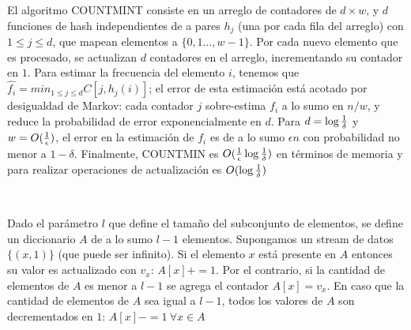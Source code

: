 \documentclass[a4paper,10pt, oneside]{article}
\begin{document}
El algoritmo COUNTMINT\cite{Cormode:2005:IDS:1073713.1073718} consiste en un arreglo de contadores de $d \times w$, y $d$ funciones de hash independientes de a pares $h_j$ (una por cada fila del arreglo) con $1 \leq j \leq d$, que mapean elementos a $\{0, 1 \dots, w-1 \}$. Por cada nuevo elemento que es procesado, se actualizan $d$ contadores en el arreglo, incrementando su contador en $1$. Para estimar la frecuencia del elemento $i$, tenemos que $\hat{f_i} = min_{1 \leq j \leq d} C[j,h_j(i)]$; el error de esta estimación está acotado por desigualdad de Markov: cada contador $j$ sobre-estima $f_i$ a lo sumo en $n/w$, y reduce la probabilidad de error exponencialmente en $d$. Para $d=\log {1 \over \delta}$ y $w = O({1 \over \epsilon})$, el error en la estimación de $f_i$ es de a lo sumo $\epsilon n$ con probabilidad no menor a $1-\delta$. Finalmente, COUNTMIN es $O({1 \over \epsilon} \log {1 \over \delta})$ en términos de memoria y para realizar operaciones de actualización es $O(\log {1 \over \delta})$

\



 Dado el parámetro $l$ que define el tamaño del subconjunto de elementos, se define un diccionario $A$ de a lo sumo $l-1$ elementos. Supongamos un stream de datos $\{(x,1)\}$ (que puede ser infinito). Si el elemento $x$ está presente en $A$ entonces su valor es actualizado con $v_x$: $A[x]+=1$. Por el contrario, si la cantidad de elementos de $A$ es menor a $l-1$ se agrega el contador $A[x]=v_x$. En caso que la cantidad de elementos de $A$ sea igual a $l-1$, todos los valores de $A$ son decrementados en $1$: $A[x]-=1 \ \forall x \in A$
\newpage
\nocite{*}
\printbibliography
\end{document}
